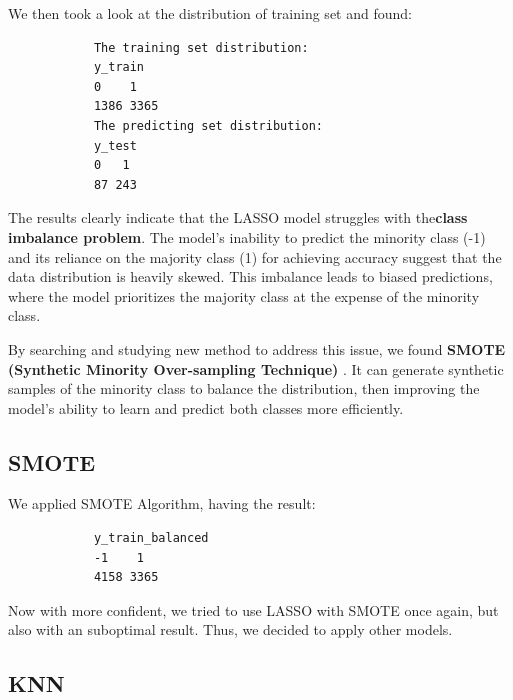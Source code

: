 \documentclass{article}
\begin{document}
	\par We then took a look at the distribution of training set and found:
		\begin{framed}
		\begin{verbatim}
			The training set distribution:
			y_train
			0    1 
			1386 3365 
			The predicting set distribution:
			y_test
			0   1 
			87 243      
		\end{verbatim}
	\end{framed}
	\par The results clearly indicate that the LASSO model struggles with the ​\textbf{class imbalance problem}. The model's inability to predict the minority class (-1) and its reliance on the majority class (1) for achieving accuracy suggest that the data distribution is heavily skewed. This imbalance leads to biased predictions, where the model prioritizes the majority class at the expense of the minority class.
	\par By searching and studying new method to address this issue, we found \textbf{SMOTE (Synthetic Minority Over-sampling Technique) }. It can generate synthetic samples of the minority class to balance the distribution, then improving the model's ability to learn and predict both classes more efficiently.
	\clearpage
	\subsection{SMOTE}
	\par We applied SMOTE Algorithm, having the result:
	\begin{framed}
		\begin{verbatim}
			y_train_balanced
			-1    1 
			4158 3365   
		\end{verbatim}
	\end{framed}
	Now with more confident, we tried to use LASSO with SMOTE once again, but also with an suboptimal result. Thus, we decided to apply other models.
	\subsection{KNN}
\end{document}
